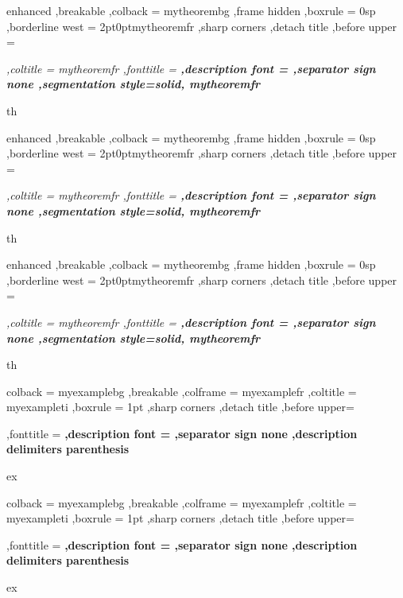 {%
	enhanced
	,breakable
	,colback = mytheorembg
	,frame hidden
	,boxrule = 0sp
	,borderline west = {2pt}{0pt}{mytheoremfr}
	,sharp corners
	,detach title
	,before upper = \tcbtitle\par\smallskip\noindent\itshape\setlength{\parindent}{1.5em}
	,coltitle = mytheoremfr
	,fonttitle = \bfseries\sffamily
	,description font = \mdseries
	,separator sign none
	,segmentation style={solid, mytheoremfr}
}
{th}


{%
	enhanced
	,breakable
	,colback = mytheorembg
	,frame hidden
	,boxrule = 0sp
	,borderline west = {2pt}{0pt}{mytheoremfr}
	,sharp corners
	,detach title
	,before upper = \tcbtitle\par\smallskip\noindent\itshape\setlength{\parindent}{1.5em}
	,coltitle = mytheoremfr
	,fonttitle = \bfseries\sffamily
	,description font = \mdseries
	,separator sign none
	,segmentation style={solid, mytheoremfr}
}
{th}

{%
	enhanced
	,breakable
	,colback = mytheorembg
	,frame hidden
	,boxrule = 0sp
	,borderline west = {2pt}{0pt}{mytheoremfr}
	,sharp corners
	,detach title
	,before upper = \tcbtitle\par\smallskip\noindent\itshape\setlength{\parindent}{1.5em}
	,coltitle = mytheoremfr
	,fonttitle = \bfseries\sffamily
	,description font = \mdseries
	,separator sign none
	,segmentation style={solid, mytheoremfr}
}
{th}


{%
	colback = myexamplebg
	,breakable
	,colframe = myexamplefr
	,coltitle = myexampleti
	,boxrule = 1pt
	,sharp corners
	,detach title
	,before upper=\tcbtitle\par\smallskip
	,fonttitle = \bfseries
	,description font = \mdseries
	,separator sign none
	,description delimiters parenthesis
}
{ex}

{%
	colback = myexamplebg
	,breakable
	,colframe = myexamplefr
	,coltitle = myexampleti
	,boxrule = 1pt
	,sharp corners
	,detach title
	,before upper=\tcbtitle\par\smallskip
	,fonttitle = \bfseries
	,description font = \mdseries
	,separator sign none
	,description delimiters parenthesis
}
{ex}

